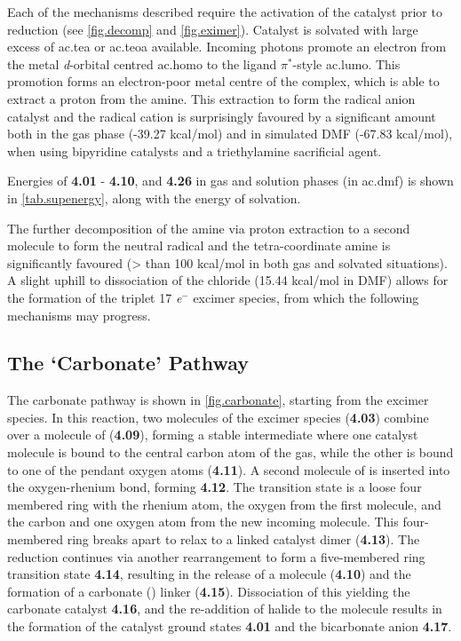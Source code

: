 Each of the mechanisms described require the activation of the catalyst prior to  reduction (see \autoref{fig.decomp} and \autoref{fig.eximer}). Catalyst is solvated with large excess of \gls{ac.tea} or \gls{ac.teoa} available. Incoming photons promote an electron from the metal \textit{d}-orbital centred \gls{ac.homo} to the ligand $\pi^\ast$-style \gls{ac.lumo}. This promotion forms an electron-poor metal centre of the complex, which is able to extract a proton from the amine. This extraction to form the radical anion catalyst and the radical cation is surprisingly favoured by a significant amount both in the gas phase (-39.27 kcal/mol) and in simulated DMF (-67.83 kcal/mol), when using bipyridine catalysts and a triethylamine sacrificial agent.

Energies of \textbf{4.01} - \textbf{4.10}, and \textbf{4.26} in gas and solution phases (in \gls{ac.dmf}) is shown in \autoref{tab.supenergy}, along with the energy of solvation. %


%

The further decomposition of the amine via proton extraction to a second molecule to form the neutral radical and the tetra-coordinate amine is significantly favoured (> than 100 kcal/mol in both gas and solvated situations). A slight uphill to dissociation of the chloride (15.44 kcal/mol in DMF) allows for the formation of the triplet 17 \textit{e}$^-$ excimer species, from which the following mechanisms may progress.

\subsection{The `Carbonate' Pathway}\label{ss.carbonate}

The carbonate pathway is shown in \autoref{fig.carbonate}, starting from the excimer species. In this reaction, two molecules of the excimer species (\textbf{4.03}) combine over a molecule of  (\textbf{4.09}), forming a stable intermediate where one catalyst molecule is bound to the central carbon atom of the gas, while the other is bound to one of the pendant oxygen atoms (\textbf{4.11}). A second molecule of  is inserted into the oxygen-rhenium bond, forming \textbf{4.12}. The transition state is a loose four membered ring with the rhenium atom, the oxygen from the first  molecule, and the carbon and one oxygen atom from the new incoming molecule. This four-membered ring breaks apart to relax to a  linked catalyst dimer (\textbf{4.13}). The  reduction continues via another rearrangement to form a five-membered ring transition state \textbf{4.14}, resulting in the release of a  molecule (\textbf{4.10}) and the formation of a carbonate () linker (\textbf{4.15}). Dissociation of this yielding the carbonate catalyst \textbf{4.16}, and the re-addition of halide to the molecule results in the formation of the catalyst ground states \textbf{4.01} and the bicarbonate anion \textbf{4.17}.


